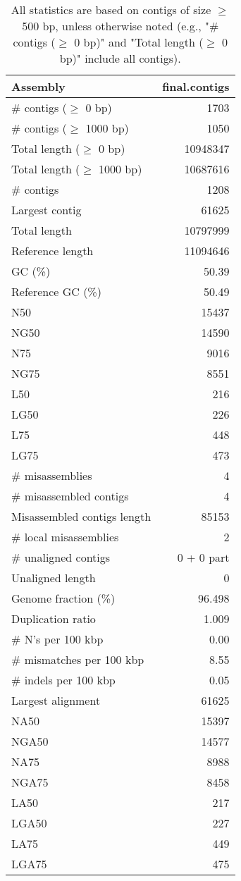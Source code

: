 \documentclass[12pt,a4paper]{article}
\begin{document}
\begin{table}[ht]
\begin{center}
\caption{All statistics are based on contigs of size $\geq$ 500 bp, unless otherwise noted (e.g., "\# contigs ($\geq$ 0 bp)" and "Total length ($\geq$ 0 bp)" include all contigs).}
\begin{tabular}{|l*{1}{|r}|}
\hline
Assembly & final.contigs \\ \hline
\# contigs ($\geq$ 0 bp) & 1703 \\ \hline
\# contigs ($\geq$ 1000 bp) & 1050 \\ \hline
Total length ($\geq$ 0 bp) & 10948347 \\ \hline
Total length ($\geq$ 1000 bp) & 10687616 \\ \hline
\# contigs & 1208 \\ \hline
Largest contig & 61625 \\ \hline
Total length & 10797999 \\ \hline
Reference length & 11094646 \\ \hline
GC (\%) & 50.39 \\ \hline
Reference GC (\%) & 50.49 \\ \hline
N50 & 15437 \\ \hline
NG50 & 14590 \\ \hline
N75 & 9016 \\ \hline
NG75 & 8551 \\ \hline
L50 & 216 \\ \hline
LG50 & 226 \\ \hline
L75 & 448 \\ \hline
LG75 & 473 \\ \hline
\# misassemblies & 4 \\ \hline
\# misassembled contigs & 4 \\ \hline
Misassembled contigs length & 85153 \\ \hline
\# local misassemblies & 2 \\ \hline
\# unaligned contigs & 0 + 0 part \\ \hline
Unaligned length & 0 \\ \hline
Genome fraction (\%) & 96.498 \\ \hline
Duplication ratio & 1.009 \\ \hline
\# N's per 100 kbp & 0.00 \\ \hline
\# mismatches per 100 kbp & 8.55 \\ \hline
\# indels per 100 kbp & 0.05 \\ \hline
Largest alignment & 61625 \\ \hline
NA50 & 15397 \\ \hline
NGA50 & 14577 \\ \hline
NA75 & 8988 \\ \hline
NGA75 & 8458 \\ \hline
LA50 & 217 \\ \hline
LGA50 & 227 \\ \hline
LA75 & 449 \\ \hline
LGA75 & 475 \\ \hline
\end{tabular}
\end{center}
\end{table}
\end{document}
